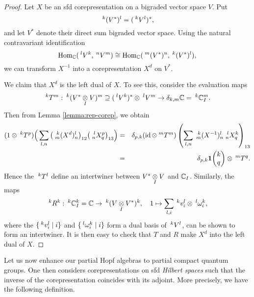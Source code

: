 \begin{proof} Let $X$ be an sfd corepresentation on a bigraded vector space $V$. Put \[\Gru{(V^*)}{k}{l} = (\Gru{V}{k}{l})^*,\] and let $V^*$ denote their direct sum bigraded vector space. Using the natural contravariant identification \[\Hom_\C(\Gru{V}{l}{k},\Gru{V}{n}{m})\cong \Hom_\C(\Gru{(V^*)}{m}{n},\Gru{(V^*)}{k}{l}),\] we can transform $X^{-1}$ into a corepresentation $X^d$ on $V^*$. 

We claim that $X^d$ is the left dual of $X$. To see this, consider the evaluation maps \[\Gru{T}{k}{m}: \Gru{(V^*\iitimes V)}{k}{m} \supseteq (\Gru{V}{l}{k})^*\otimes \Gru{V}{l}{m}\rightarrow \delta_{k,m} \C = \Gru{\C_I}{k}{m}.\] Then from Lemma \ref{lemma:rep-corep}, we obtain \begin{eqnarray*} (1\otimes \Gru{T}{k}{p})\Big{(} \sum_{l,n} \big{(} \Gr{(X^d)}{k}{l}{m}{n}\big{)}_{12} \big{(}\Gr{X}{l}{p}{n}{q}\big{)}_{13}\Big{)} &=& \delta_{p,k}(\id\otimes \Gru{T}{m}{m}) \left( \sum_{l,n}  \Gr{(X^{-1})}{k}{l}{m}{n}\Gr{X}{l}{k}{n}{q}\right)_{13} \\ &=& \delta_{p,k}\UnitC{k}{q}\otimes \Gru{T}{m}{q}.\end{eqnarray*} Hence the $\Gru{T}{k}{l}$ define an intertwiner between $V^*\iitimes V$ and $\C_I$. Similarly, the maps  \[\Gru{R}{k}{k}: \Gru{\C_I}{k}{k} = \C\rightarrow \Gru{(V\iitimes V^*)}{k}{k},\quad 1\mapsto \sum_{l,i} \Gru{v_i}{k}{l}\otimes \Gru{\omega_i}{l}{k},\] where the $\{\Gru{v_i}{k}{l}\mid i\}$ and $\{\Gru{\omega_i}{l}{k} \mid i\}$ form a dual basis of $\Gru{V}{k}{l}$, can be shown to form an intertwiner. It is then easy to check that $T$ and $R$ make $X^d$ into the left dual of $X$. %
\end{proof}

Let us now enhance our partial Hopf algebras to partial compact quantum groups. One then considers corepresentations on sfd \emph{Hilbert spaces} such that the inverse of the corepresentation coincides with its adjoint. More precisely, we have the following definition.


